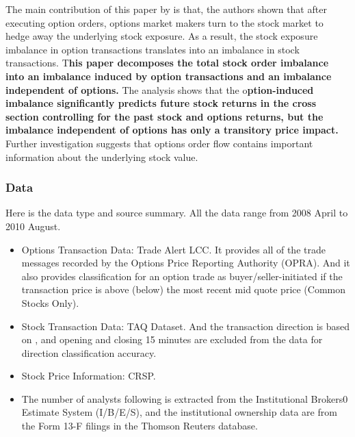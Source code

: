 \documentclass[10pt]{report}
\begin{document}
The main contribution of this paper by \citet{Hu2014DoesOT} is that, the authors shown that after executing option orders, options market makers turn to the stock market to hedge away the underlying stock exposure. As a result, the stock exposure imbalance in option transactions translates into an imbalance in stock transactions. T\textbf{his paper decomposes the total stock order imbalance into an imbalance induced by option transactions and an imbalance independent of options.} The analysis shows that the o\textbf{ption-induced imbalance significantly predicts future stock returns in the cross section controlling for the past stock and options returns, but the imbalance independent of options has only a transitory price impact.} Further investigation suggests that options order flow contains important information about the underlying stock value.


\subsubsection{Data}

Here is the data type and source summary. All the data range from 2008 April to 2010 August.
\begin{itemize}
    \item Options Transaction Data: Trade Alert LCC. It provides all of the trade messages recorded by the Options Price Reporting Authority (OPRA). And it also provides classification for an option trade as buyer/seller-initiated if the transaction price is above (below) the most recent mid quote price (Common Stocks Only).
    \item Stock Transaction Data: TAQ Dataset. And the transaction direction is based on \citet{LEE1991InferringTD}, and opening and closing 15 minutes are excluded from the data for direction classification accuracy.
    \item Stock Price Information: CRSP.
    \item The number of analysts following is extracted from the Institutional Brokers0 Estimate System (I/B/E/S), and the institutional ownership data are from the Form 13-F filings in the Thomson Reuters database.
\end{itemize}
\end{document}
